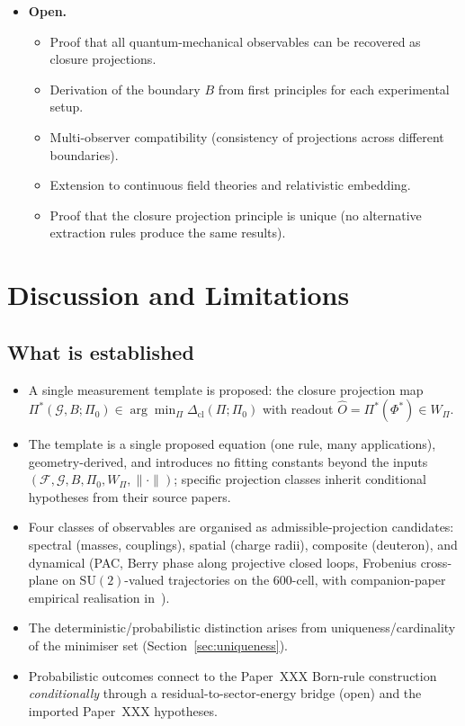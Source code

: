 \documentclass[12pt]{article}
\newcommand{\Fcal}{\mathcal{F}}
\newcommand{\Gcal}{\mathcal{G}}
\newcommand{\Dcl}{\Delta_{\mathrm{cl}}}
\begin{document}
\begin{itemize}
    \item[$\circ$] \textbf{Open.}
    \begin{itemize}
        \item Proof that all quantum-mechanical observables can be recovered as closure projections.
        \item Derivation of the boundary $B$ from first principles for each experimental setup.
        \item Multi-observer compatibility (consistency of projections across different boundaries).
        \item Extension to continuous field theories and relativistic embedding.
        \item Proof that the closure projection principle is unique (no alternative extraction rules produce the same results).
    \end{itemize}
\end{itemize}

\section{Discussion and Limitations}\label{sec:discussion}

\subsection{What is established}

\begin{itemize}
    \item A single measurement template is proposed: the closure projection map $\Pi^*(\Gcal, B; \Pi_0) \in \arg\min_\Pi \Dcl(\Pi;\Pi_0)$ with readout $\hat{O} = \Pi^*(\Phi^*) \in W_\Pi$.
    \item The template is a single proposed equation (one rule, many applications), geometry-derived, and introduces no fitting constants beyond the inputs $(\Fcal, \Gcal, B, \Pi_0, W_\Pi, \|\cdot\|)$; specific projection classes inherit conditional hypotheses from their source papers.
    \item Four classes of observables are organised as admissible-projection candidates: spectral (masses, couplings), spatial (charge radii), composite (deuteron), and dynamical (PAC, Berry phase along projective closed loops, Frobenius cross-plane on $\mathrm{SU}(2)$-valued trajectories on the 600-cell, with companion-paper empirical realisation in~\citep{H4Coxeter2026}).
    \item The deterministic/probabilistic distinction arises from uniqueness/cardinality of the minimiser set (Section~\ref{sec:uniqueness}).
    \item Probabilistic outcomes connect to the Paper~XXX Born-rule construction \emph{conditionally} through a residual-to-sector-energy bridge (open) and the imported Paper~XXX hypotheses.
\end{itemize}
\end{document}
